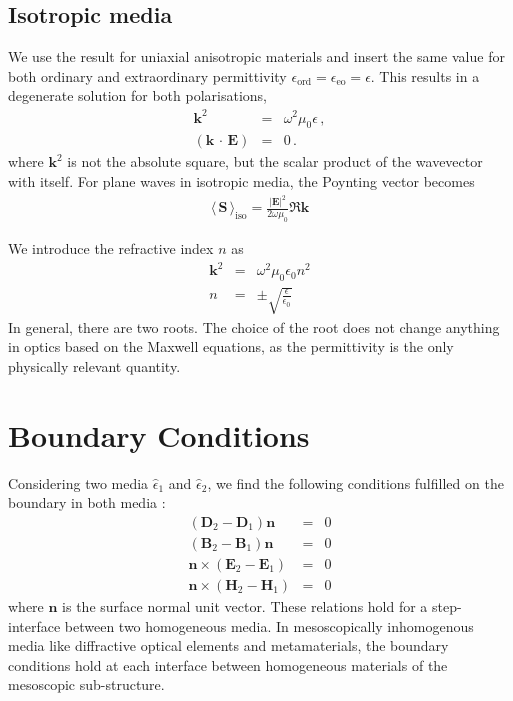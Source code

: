 \documentclass[12pt,a4paper,twoside,openright,BCOR10mm,headsepline,titlepage,abstracton,chapterprefix,final]{scrreprt}
\newcommand\Vector[1]{{\mathbf{#1}}}
\newcommand\vacuum{0}
\newcommand\wavenumber{k}
\newcommand\Wavevector{\Vector{\wavenumber}}
\newcommand\Tensor[1]{\hat{#1}}
\newcommand{\scpm}[2]{(#1\,\cdot\,#2)}
\newcommand\scalarEfield{E}
\newcommand\scalarBfield{B}
\newcommand\scalarHfield{H}
\newcommand\scalarDfield{D}
\newcommand\Efield{\Vector{\scalarEfield}}
\newcommand\Bfield{\Vector{\scalarBfield}}
\newcommand\Hfield{\Vector{\scalarHfield}}
\newcommand\Dfield{\Vector{\scalarDfield}}
\newcommand\vacuumpermeability{\mu_{\vacuum}}
\newcommand\permittivity{\Tensor{\epsilon}}
\newcommand\vacuumpermittivity{\epsilon_{\vacuum}}
\newcommand\scalarpermittivity{\epsilon}
\newcommand\ordi{\text{ord}}
\newcommand\eo{\text{eo}}
\newcommand{\timeavg}[1]{{\langle\,#1\,\rangle}}
\begin{document}
\subsection{Isotropic media}

We use the result for uniaxial anisotropic materials and insert the same value for both ordinary and extraordinary permittivity $\scalarpermittivity_{\ordi} = \scalarpermittivity_{\eo} = \scalarpermittivity$.
This results in a degenerate solution for both polarisations,
\begin{eqnarray}
 \Wavevector^2 &=& \omega^2 \vacuumpermeability \scalarpermittivity\,, \\
 \scpm{\Wavevector}{\Efield} &=& 0\,.
\end{eqnarray}
where $\Wavevector^2$ is not the absolute square, but the scalar product of the wavevector with itself.
For plane waves in isotropic media, the Poynting vector becomes 
\begin{eqnarray}
 \timeavg{\Vector{S}}_\text{iso} = \frac{ |\Efield|^2 }{ 2\omega\vacuumpermeability } \Re \Wavevector
\end{eqnarray}

We introduce the refractive index $n$ as
\begin{eqnarray}
 \Wavevector^2 &=& \omega^2 \vacuumpermeability \vacuumpermittivity n^2 \\
 n &=& \pm \sqrt{ \frac{\scalarpermittivity}{\vacuumpermittivity} }
\end{eqnarray}
In general, there are two roots. 
The choice of the root does not change anything in optics based on the Maxwell equations, as the permittivity is the only physically relevant quantity.




\section{Boundary Conditions}
Considering two media $\permittivity_1$ and $\permittivity_2$, we find the following conditions fulfilled on the boundary in both media \cite{Jackson}:
\begin{subequations}
\begin{eqnarray}
 ( \Dfield_2 - \Dfield_1 ) \Vector{n} &=& 0 \\
 ( \Bfield_2 - \Bfield_1 ) \Vector{n} &=& 0 \\
 \Vector{n} \times ( \Efield_2 - \Efield_1 ) &=& 0 \\
 \Vector{n} \times ( \Hfield_2 - \Hfield_1 ) &=& 0 
\end{eqnarray}
\label{eq:boundary_conditions} 
\end{subequations}
where $\Vector{n}$ is the surface normal unit vector.
These relations hold for a step-interface between two homogeneous media. 
In mesoscopically inhomogenous media like  diffractive optical elements and metamaterials, 
the boundary conditions hold at each interface between homogeneous materials of the mesoscopic sub-structure.
\end{document}
